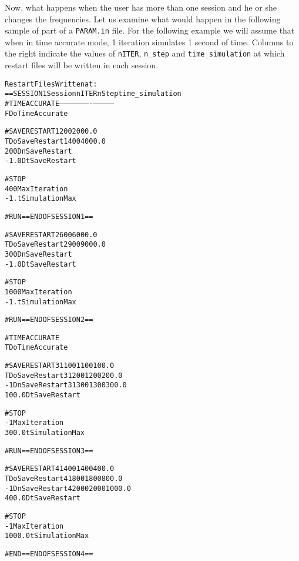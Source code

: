 Now, what happens when the user has more than one session and he or she
changes the frequencies.  Let us examine what would happen in the following
sample of part of a {\tt PARAM.in} file.  For the following example we will
assume that when in time accurate mode, 1 iteration simulates 1 second of time.
Columns to the right indicate the values of {\tt nITER}, {\tt n\_step} and
{\tt time\_simulation} at which restart files will be written in each session.

\clearpage

\begin{alltt}
                                             Restart Files Written at:
==SESSION 1       \hfill        Session   nITER   nStep   time_simulation
#TIMEACCURATE	  \hfill        --------  ------  -------  --------------
F            DoTimeAccurate  

#SAVERESTART                      \hfill  1       200      200              0.0  
T            DoSaveRestart     \hfill  1       400      400              0.0
200          DnSaveRestart
-1.0         DtSaveRestart

#STOP
400          MaxIteration
-1.          tSimulationMax

#RUN ==END OF SESSION 1== 
                         
#SAVERESTART			  \hfill  2       600      600              0.0
T            DoSaveRestart	  \hfill  2       900      900              0.0
300          DnSaveRestart
-1.0         DtSaveRestart
				
#STOP				
1000         MaxIteration				
-1.          tSimulationMax
				
#RUN ==END OF SESSION 2== 

#TIMEACCURATE
T            DoTimeAccurate  		
				
#SAVERESTART			  \hfill  3      1100     1100            100.0
T            DoSaveRestart	  \hfill  3      1200     1200            200.0
-1           DnSaveRestart  \hfill  3      1300     1300            300.0
100.0        DtSaveRestart
				
#STOP				
-1           MaxIteration				
300.0        tSimulationMax			
				
#RUN ==END OF SESSION 3== 
                          
#SAVERESTART                \hfill   4      1400     1400            400.0
T            DoSaveRestart  \hfill   4      1800     1800            800.0
-1           DnSaveRestart  \hfill   4      2000     2000           1000.0
400.0        DtSaveRestart
 				
#STOP				
-1           MaxIteration				
1000.0       tSimulationMax				
				
#END  ==END OF SESSION 4== 
\end{alltt}
